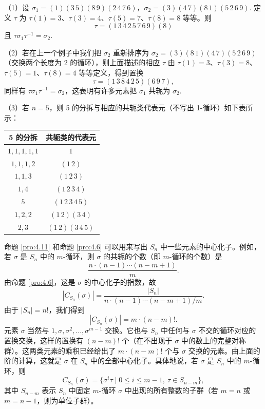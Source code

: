 \begin{example}
（1）设 \(\sigma_1 = (1)(3\,5)(8\,9)(2\,4\,7\,6)\)，\(\sigma_2 = (3)(4\,7)(8\,1)(5\,2\,6\,9)\). 定义 \(\tau\) 为 \(\tau(1) = 3\)、\(\tau(3) = 4\)、\(\tau(5) = 7\)、\(\tau(8) = 8\) 等等。则
\[
\tau = (1\,3\,4\,2\,5\,7\,6\,9)(8)
\]
且 \(\tau\sigma_1\tau^{-1} = \sigma_2\).

（2）若在上一个例子中我们把 \(\sigma_2\) 重新排序为 \(\sigma_2 = (3)(8\,1)(4\,7)(5\,2\,6\,9)\)（交换两个长度为 2 的循环），则上面描述的相应 \(\tau\) 由 \(\tau(1) = 3\)、\(\tau(3) = 8\)、\(\tau(5) = 1\)、\(\tau(8) = 4\) 等等定义，得到置换
\[
\tau = (1\,3\,8\,4\,2\,5)(6\,9\,7),
\]
同样有 \(\tau\sigma_1\tau^{-1} = \sigma_2\)，这表明有许多元素把 \(\sigma_1\) 共轭为 \(\sigma_2\).

（3）若 \(n = 5\)，则 5 的分拆与相应的共轭类代表元（不写出 1-循环）如下表所示：

\begin{center}
\begin{tabular}{cc}
\hline
5 的分拆 & 共轭类的代表元 \\
\hline
\(1, 1, 1, 1, 1\) & \(1\) \\
\(1, 1, 1, 2\) & \((1\,2)\) \\
\(1, 1, 3\) & \((1\,2\,3)\) \\
\(1, 4\) & \((1\,2\,3\,4)\) \\
\(5\) & \((1\,2\,3\,4\,5)\) \\
\(1, 2, 2\) & \((1\,2)(3\,4)\) \\
\(2, 3\) & \((1\,2)(3\,4\,5)\) \\
\hline
\end{tabular}
\end{center}
\end{example}

命题 \ref{pro:4.11} 和命题 \ref{pro:4.6} 可以用来写出 \(S_n\) 中一些元素的中心化子。例如，若 \(\sigma\) 是 \(S_n\) 中的 \(m\)-循环，则 \(\sigma\) 的共轭的个数（即 \(m\)-循环的个数）是
\[
\frac{n \cdot (n-1) \cdots (n-m+1)}{m}.
\]
由命题 \ref{pro:4.6}，这是 \(\sigma\) 的中心化子的指数，故
\[
|C_{S_n}(\sigma)| = \frac{|S_n|}{n \cdot (n-1) \cdots (n-m+1)/m}.
\]
由于 \(|S_n| = n!\)，我们得到
\[
|C_{S_n}(\sigma)| = m \cdot (n-m)!.
\]
元素 \(\sigma\) 当然与 \(1, \sigma, \sigma^2, \ldots, \sigma^{m-1}\) 交换。它也与 \(S_n\) 中任何与 \(\sigma\) 不交的循环对应的置换交换，这样的置换有 \((n-m)!\) 个（在不出现于 \(\sigma\) 中的数上的完整对称群）。这两类元素的乘积已经给出了 \(m \cdot (n-m)!\) 个与 \(\sigma\) 交换的元素。由上面的阶的计算，这就是 \(\sigma\) 在 \(S_n\) 中的全部中心化子。具体地说，若 \(\sigma\) 是 \(S_n\) 中的 \(m\)-循环，则
\[
C_{S_n}(\sigma) = \{\sigma^i \tau \mid 0 \leq i \leq m-1,\ \tau \in S_{n-m}\},
\]
其中 \(S_{n-m}\) 表示 \(S_n\) 中固定 \(m\)-循环 \(\sigma\) 中出现的所有整数的子群（若 \(m = n\) 或 \(m = n-1\)，则为单位子群）。

